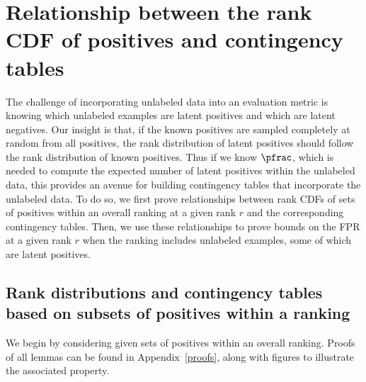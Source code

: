 \section{Relationship between the rank CDF of positives and contingency tables} \label{rank-roc}
The challenge of incorporating unlabeled data into an evaluation metric is knowing which unlabeled examples are latent positives and which are latent negatives. Our insight is that, if the known positives are sampled completely at random from all positives, the rank distribution of latent positives should follow the rank distribution of known positives. Thus if we know $\pfrac$, which is needed to compute the expected number of latent positives within the unlabeled data, this provides an avenue for building contingency tables that incorporate the unlabeled data. To do so, we first prove relationships between rank CDFs of sets of positives within an overall ranking at a given rank $r$ and the corresponding contingency tables. Then, we use these relationships to prove bounds on the FPR at a given rank $r$ when the ranking includes unlabeled examples, some of which are latent positives. 




\subsection{Rank distributions and contingency tables based on subsets of positives within a ranking}
We begin by considering given sets of positives within an overall ranking. Proofs of all lemmas can be found in Appendix~\ref*{proofs}, along with figures to illustrate the associated property.

